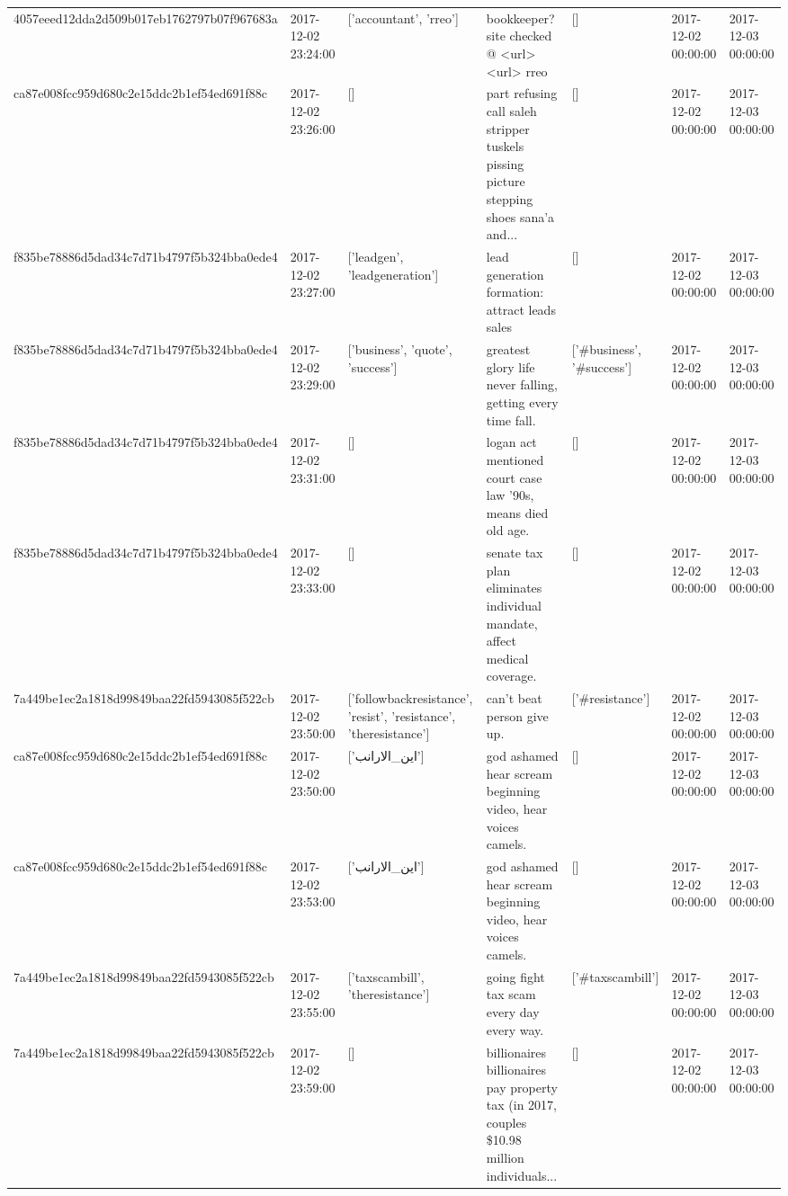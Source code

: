\begin{tabular}{lllllll}
4057eeed12dda2d509b017eb1762797b07f967683a & 2017-12-02 23:24:00 & ['accountant', 'rreo'] & bookkeeper? site checked @ <url> <url> rreo & [] & 2017-12-02 00:00:00 & 2017-12-03 00:00:00 \\
ca87e008fcc959d680c2e15ddc2b1ef54ed691f88c & 2017-12-02 23:26:00 & [] & part refusing call saleh stripper tuskels pissing picture stepping shoes sana'a and... & [] & 2017-12-02 00:00:00 & 2017-12-03 00:00:00 \\
f835be78886d5dad34c7d71b4797f5b324bba0ede4 & 2017-12-02 23:27:00 & ['leadgen', 'leadgeneration'] & lead generation formation: attract leads sales & [] & 2017-12-02 00:00:00 & 2017-12-03 00:00:00 \\
f835be78886d5dad34c7d71b4797f5b324bba0ede4 & 2017-12-02 23:29:00 & ['business', 'quote', 'success'] & greatest glory life never falling, getting every time fall. & ['#business', '#success'] & 2017-12-02 00:00:00 & 2017-12-03 00:00:00 \\
f835be78886d5dad34c7d71b4797f5b324bba0ede4 & 2017-12-02 23:31:00 & [] & logan act mentioned court case law '90s, means died old age. & [] & 2017-12-02 00:00:00 & 2017-12-03 00:00:00 \\
f835be78886d5dad34c7d71b4797f5b324bba0ede4 & 2017-12-02 23:33:00 & [] & senate tax plan eliminates individual mandate, affect medical coverage. & [] & 2017-12-02 00:00:00 & 2017-12-03 00:00:00 \\
7a449be1ec2a1818d99849baa22fd5943085f522cb & 2017-12-02 23:50:00 & ['followbackresistance', 'resist', 'resistance', 'theresistance'] & can't beat person give up. & ['#resistance'] & 2017-12-02 00:00:00 & 2017-12-03 00:00:00 \\
ca87e008fcc959d680c2e15ddc2b1ef54ed691f88c & 2017-12-02 23:50:00 & ['اين_الارانب'] & god ashamed hear scream beginning video, hear voices camels. & [] & 2017-12-02 00:00:00 & 2017-12-03 00:00:00 \\
ca87e008fcc959d680c2e15ddc2b1ef54ed691f88c & 2017-12-02 23:53:00 & ['اين_الارانب'] & god ashamed hear scream beginning video, hear voices camels. & [] & 2017-12-02 00:00:00 & 2017-12-03 00:00:00 \\
7a449be1ec2a1818d99849baa22fd5943085f522cb & 2017-12-02 23:55:00 & ['taxscambill', 'theresistance'] & going fight tax scam every day every way. & ['#taxscambill'] & 2017-12-02 00:00:00 & 2017-12-03 00:00:00 \\
7a449be1ec2a1818d99849baa22fd5943085f522cb & 2017-12-02 23:59:00 & [] & billionaires billionaires pay property tax (in 2017, couples \$10.98 million individuals... & [] & 2017-12-02 00:00:00 & 2017-12-03 00:00:00 \\
\bottomrule
\end{tabular}
